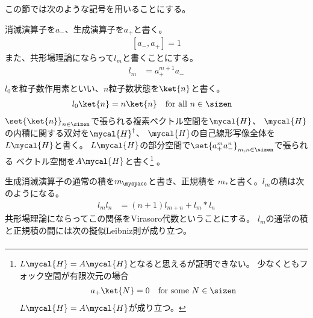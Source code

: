 	この節では次のような記号を用いることにする。
	\begin{description}\setlength{\itemsep}{-1mm} %
		\item[フォック空間] 消滅演算子を$a_-$、生成演算子を$a_+$と書く。
		\begin{equation*}\begin{split} %
			[a_-,a_+] = 1
		\end{split}\end{equation*} %
		また、共形場理論にならって$l_m$と書くことにする。
		\begin{equation*}\begin{split} %
			l_m &= a_+^{m+1}a_- \\
		\end{split}\end{equation*} %
		$l_0$を粒子数作用素といい、$n$粒子数状態を$\ket{n}$と書く。
		\begin{equation*}\begin{split} %
			l_0\ket{n} &= n\ket{n}\quad\text{for all }n\in\sizen
		\end{split}\end{equation*} %
		$\set{\ket{n}}_{n\in\sizen}$で張られる複素ベクトル空間を$\mycal{H}$、
		$\mycal{H}$の内積に関する双対を$\mycal{H}^\dag$、
		$\mycal{H}$の自己線形写像全体を$L\mycal{H}$と書く。
		$L\mycal{H}$の部分空間で$\set{a_+^ma_-^n}_{m,n\in\sizen}$で張られる
		ベクトル空間を$A\mycal{H}$と書く\footnote{
			$L\mycal{H}=A\mycal{H}$となると思えるが証明できない。
			少なくともフォック空間が有限次元の場合
			\begin{equation*}\begin{split} %
				a_+\ket{N} = 0 \quad\text{for some }N\in\sizen
			\end{split}\end{equation*} %
			$L\mycal{H}=A\mycal{H}$が成り立つ。
		}	。
		\item[正規積] 生成消滅演算子の通常の積を$m_\myspace$と書き、正規積を
		$m_*$と書く。$l_m$の積は次のようになる。
		\begin{equation}\label{eq:lの積}\begin{split} %
			l_ml_n &= (n+1)l_{m+n} + l_m*l_n
		\end{split}\end{equation} %
		共形場理論にならってこの関係をVirasoro代数ということにする。
		$l_m$の通常の積と正規積の間には次の擬似Leibniz則が成り立つ。
		\begin{equation}\label{eq:lのライプニッツ則}\begin{split} %

\end{split}
\end{equation}
\end{description}
